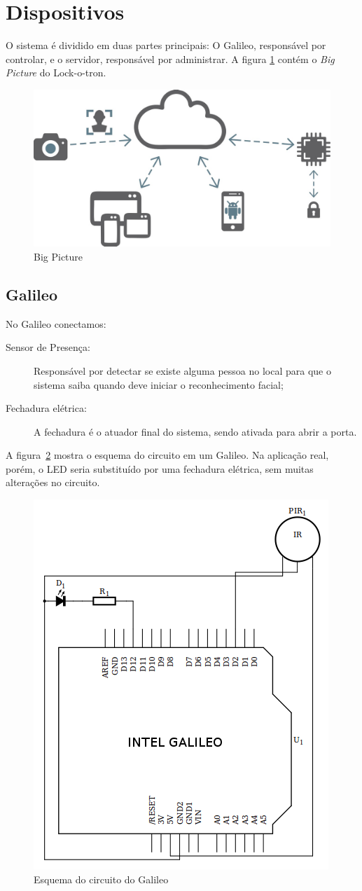 \documentclass[12pt]{article}
\begin{document}
\section{Dispositivos}
    O sistema é dividido em duas partes principais: O Galileo, responsável por
    controlar, e o servidor, responsável por administrar. A figura \ref{fig:bigpicture}
    contém o \textit{Big Picture} do Lock-o-tron.

   \begin{figure}[ht]
		\centering
		\includegraphics[width=.5\textwidth]{big-picture}
		\caption{Big Picture}
		\label{fig:bigpicture}
	\end{figure}


\subsection{Galileo}
    No Galileo conectamos:
    \begin{description}
        \item[Sensor de Presença:] Responsável por detectar se existe alguma
        pessoa no local para que o sistema saiba quando deve iniciar o
        reconhecimento facial;
        \item[Fechadura elétrica:] A fechadura é o atuador final do sistema,
        sendo ativada para abrir a porta.
    \end{description}

    A figura~\ref{fig:schema} mostra o esquema do circuito em um Galileo. Na
    aplicação real, porém, o LED seria substituído por uma fechadura elétrica,
    sem muitas alterações no circuito.

   \begin{figure}[ht]
		\centering
		\includegraphics[width=.5\textwidth]{schematics}
		\caption{Esquema do circuito do Galileo}
		\label{fig:schema}
	\end{figure}
\end{document}
